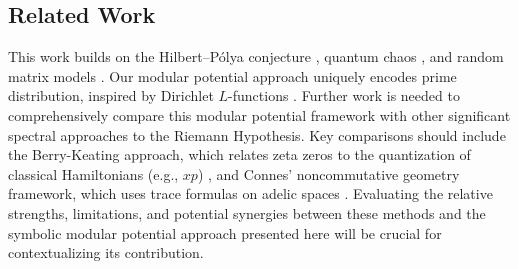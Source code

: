\subsection*{Related Work}
This work builds on the Hilbert--P\'olya conjecture \cite{Connes1999, BerryKeating1999}, quantum chaos \cite{BerryKeating1999}, and random matrix models \cite{Montgomery1973}. Our modular potential approach uniquely encodes prime distribution, inspired by Dirichlet \( L \)-functions \cite{Davenport1980}.
Further work is needed to comprehensively compare this modular potential framework with other significant spectral approaches to the Riemann Hypothesis. Key comparisons should include the Berry-Keating approach, which relates zeta zeros to the quantization of classical Hamiltonians (e.g., \(xp\)) \cite{BerryKeating1999}, and Connes' noncommutative geometry framework, which uses trace formulas on adelic spaces \cite{Connes1999}. Evaluating the relative strengths, limitations, and potential synergies between these methods and the symbolic modular potential approach presented here will be crucial for contextualizing its contribution.

